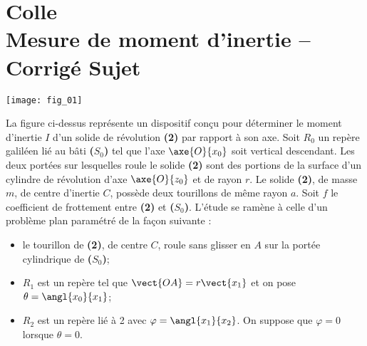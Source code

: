 \chapter*{Colle  \\ 
Mesure de moment d'inertie -- \ifprof Corrigé \else Sujet \fi}

\iflivret {} \else
\ifprof  {} \else \fi
\fi

\setcounter{question}{0}



\begin{marginfigure}
\texttt{[image: fig\_01]}
\end{marginfigure}

La figure ci-dessus représente un dispositif conçu pour déterminer le moment d'inertie $I$ d'un solide de révolution \textbf{(2)} par rapport à son axe. Soit $R_0$ un repère galiléen lié au bâti \textbf{($S_0$)} tel que l'axe $\axe{O}{x_0}$ soit vertical descendant. Les deux portées sur lesquelles roule le solide \textbf{(2)} sont des portions de la surface d'un cylindre de révolution d'axe $\axe{O}{z_0}$ et de rayon $r$.
Le solide \textbf{(2)}, de masse $m$, de centre d'inertie $C$, possède deux tourillons de même rayon $a$. Soit $f$ le coefficient de frottement entre \textbf{(2)} et \textbf{($S_0$)}.
L'étude se ramène à celle d'un problème plan paramétré de la façon suivante :
\begin{itemize}
\item le tourillon de \textbf{(2)}, de centre $C$, roule sans glisser en $A$ sur la portée cylindrique de \textbf{($S_0$)};
\item $R_1$ est un repère tel que $\vect{OA} = r\vect{x_1}$ et on pose $\theta=\angl{x_0}{x_1}$;
\item $R_2$ est un repère lié à 2 avec $\varphi=\angl{x_1}{x_2}$. On suppose que $\varphi = 0$ lorsque $\theta=0$.
\end{itemize}


